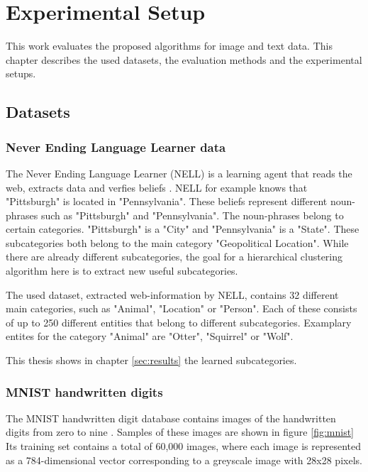 \chapter{Experimental Setup}

This work evaluates the proposed algorithms for image and text data. This chapter describes the used datasets, the evaluation methods and the experimental setups.

\section{Datasets}
\label{chapter:datasets}

\subsection{Never Ending Language Learner data}

The Never Ending Language Learner (NELL) is a learning agent that reads the web, extracts data and verfies beliefs \cite{Mitchell:2015:NL:2886521.2886641}\cite{Mitchell:2018:NL:3210350.3191513}. NELL for example knows that "Pittsburgh" is located in "Pennsylvania". These beliefs represent different noun-phrases such as "Pittsburgh" and "Pennsylvania". The noun-phrases belong to certain categories. "Pittsburgh" is a "City" and "Pennsylvania" is a "State". These subcategories both belong to the main category "Geopolitical Location". While there are already different subcategories, the goal for a hierarchical clustering algorithm here is to extract new useful subcategories.

The used dataset, extracted web-information by NELL, contains 32 different main categories, such as "Animal", "Location" or "Person". Each of these consists of up to 250 different entities that belong to different subcategories. Examplary entites for the category "Animal" are "Otter", "Squirrel" or "Wolf". 

This thesis shows in chapter \ref{sec:results} the learned subcategories.

\subsection{MNIST handwritten digits}

The MNIST handwritten digit database contains images of the handwritten digits from zero to nine \cite{lecun-mnisthandwrittendigit-2010}. Samples of these images are shown in figure \ref{fig:mnist} Its training set contains a total of 60,000 images, where each image is represented as a 784-dimensional vector corresponding to a greyscale image with 28x28 pixels.

